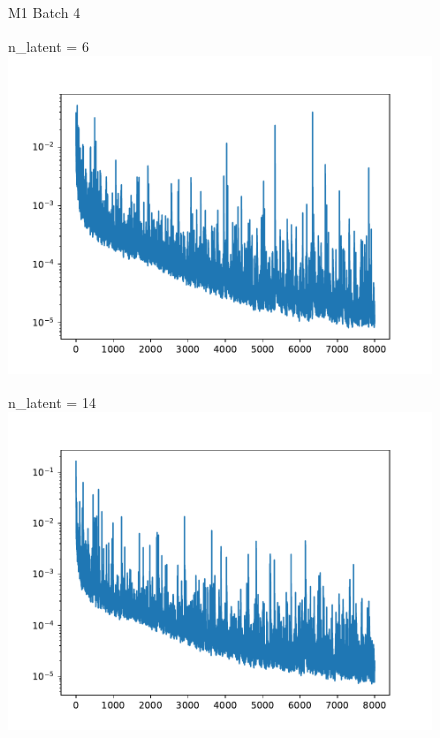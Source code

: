 \documentclass[USenglish]{article}
\newcommand{\1}{\begin{pmatrix}
		1\\
		1
\end{pmatrix}}
\begin{document}
\begin{figure}
	\centering
	M1 Batch 4\\[0.5em]
	\begin{minipage}{0.32\textwidth}
		\centering
		n\_latent = 6\\
	\includegraphics[width=\textwidth, trim={20 0 45 30}, clip]{loss_convAE_trial_001_batch_004_n_dense_006.pdf}
	\end{minipage}
	\begin{minipage}{0.32\textwidth}
	\centering
	n\_latent = 14\\
	\includegraphics[width=\textwidth, trim={20 0 45 30}, clip]{loss_convAE_trial_001_batch_004_n_dense_014.pdf}
\end{minipage}

\end{figure}
\end{document}
